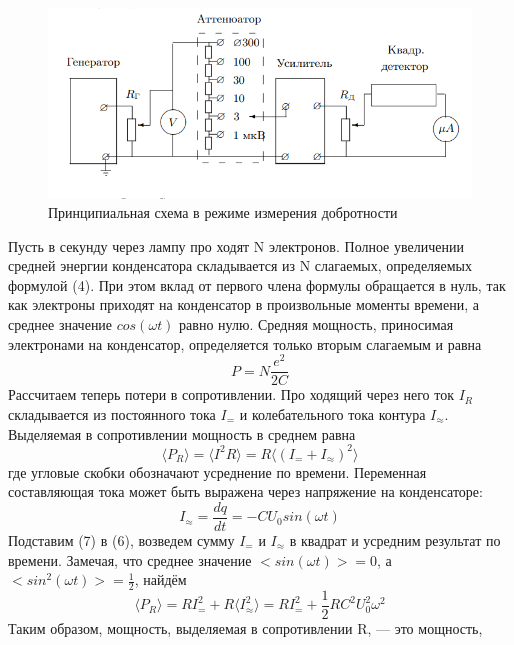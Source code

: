 \documentclass[a4paper, 12pt]{article}%
\begin{document}
 	\begin{figure}[H]
 		\centering
 		\includegraphics[width=0.9\linewidth]{доюротность}
 		\caption{Принципиальная схема в режиме измерения добротности}
 		\label{fig:}
 	\end{figure}
 	
 	Пусть в секунду через лампу про
 	ходят
 	N электронов. Полное увеличении
 	средней энергии
 	конденсатора складывается из
 	N слагаемых, определяемых формулой (4). При этом вклад от первого члена формулы обращается в нуль, так
 	как электроны приходят на
 	конденсатор в произвольные
 	моменты времени, а среднее значение $cos(\omega t)$ равно нулю. Средняя мощность, приносимая электронами на
 	конденсатор, определяется
 	только вторым слагаемым
 	и равна
	 \begin{equation}
	 	P = N \frac{e^2}{2C}
	 \end{equation}
 	Рассчитаем теперь потери в сопротивлении. Про
 	ходящий через него
 	ток $I_R$ складывается из постоянного тока $I_=$
 	и
 	колебательного тока
 	контура
 	$I_{\approx}$. Выделяемая в сопротивлении мощность в среднем равна
 	\begin{equation}
 		⟨P_R⟩=⟨I^2R⟩=R⟨(I_= + I_\approx)^2⟩
 	\end{equation}
 	где угловые скобки обозначают
 	усреднение по времени. Переменная составляющая тока может быть выражена через напряжение на
 	конденсаторе:
 	\begin{equation}
 		I_\approx = \frac{dq}{dt} = -CU_0sin(\omega t)
 	\end{equation}
 	Подставим (7) в (6), возведем сумму $I_=$ и $I_\approx$ в квадрат
 	и
 	усредним результат по времени. Замечая, что среднее значение $<sin(\omega t)> = 0$, а $<sin^2(\omega t)> = \frac{1}{2}$, найдём
 	\begin{equation}
 		⟨P_R⟩ = RI_=^2 + R⟨I_\approx^2⟩ = RI_=^2 + \frac{1}{2} R C^2 U_0^2 \omega^2
 	\end{equation}
 	Таким образом, мощность, выделяемая в сопротивлении
 	R, — это мощность,
\end{document}
